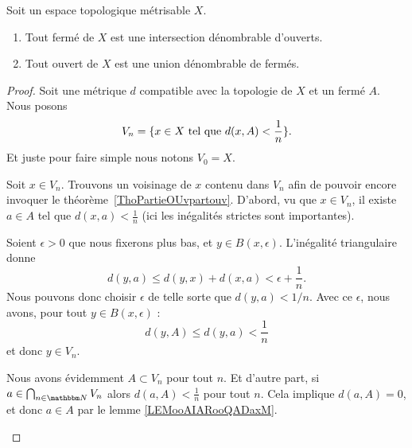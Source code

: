 \begin{proposition}      \label{PROPooXWBTooCvGLOj}
    Soit un espace topologique métrisable \( X\).
    \begin{enumerate}
        \item   \label{ITEMooOXVRooBsKwuq}
            Tout fermé de \( X\) est une intersection dénombrable d'ouverts.
        \item
            Tout ouvert de \( X\) est une union dénombrable de fermés.
    \end{enumerate}
\end{proposition}

\begin{proof}
    Soit une métrique \( d\) compatible avec la topologie de \( X\) et un fermé \( A\). Nous posons
    \begin{equation}
        V_n=\{ x\in X\text{ tel que } d(x,A)<\frac{1}{ n } \}.
    \end{equation}
    Et juste pour faire simple nous notons \( V_0=X\).
    \begin{subproof}
        \item[Les parties \( V_n\) sont ouvertes]
            Soit \( x\in V_n\). Trouvons un voisinage de \( x\) contenu dans \( V_n\) afin de pouvoir encore invoquer le théorème~\ref{ThoPartieOUvpartouv}. D'abord, vu que \( x\in V_n\), il existe \( a\in A\) tel que \( d(x,a)<\frac{ 1 }{ n }\) (ici les inégalités strictes sont importantes).

            Soient \( \epsilon>0\) que nous fixerons plus bas, et \( y\in B(x,\epsilon)\). L'inégalité triangulaire donne
            \begin{equation}
                d(y,a)\leq d(y,x)+d(x,a)<\epsilon+\frac{1}{ n }.
            \end{equation}
            Nous pouvons donc choisir \( \epsilon\) de telle sorte que \( d(y,a)<1/n\). Avec ce \( \epsilon\), nous avons, pour tout \( y\in B(x,\epsilon)\) :
            \begin{equation}
                d(y,A)\leq d(y,a)<\frac{1}{ n }
            \end{equation}
            et donc \( y\in V_n\).
        \item[\( A\) est l'intersection des \( V_n\)]

            Nous avons évidemment \( A\subset V_n\) pour tout \( n\). Et d'autre part, si \( a\in\bigcap_{n\in \eN} V_n\) alors \( d(a,A)<\frac{1}{ n }\) pour tout \( n\). Cela implique \( d(a,A)=0\), et donc \( a\in A\) par le lemme \ref{LEMooAIARooQADaxM}.%


\end{subproof}
\end{proof}
